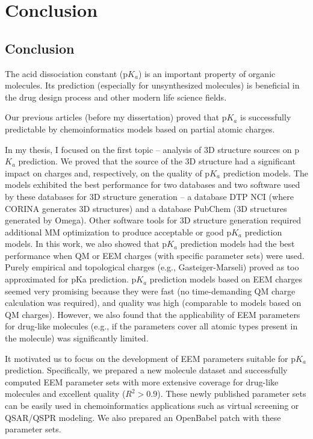 \part{Conclusion}

\chapter{Conclusion}

The acid dissociation constant (p$K_a$) is an important property of organic
mo\-le\-cules. Its prediction (especially for unsynthesized molecules) is beneficial
in the drug design process and other modern life science fields.

Our previous articles \cite{Svobodova2011, Svobodova2013} (before my
dissertation) proved that p$K_a$ is successfully predictable by
chemoinformatics models based on partial atomic charges.

In my thesis, I focused on the first topic -- analysis of 3D structure sources
on p$K_a$ prediction. We proved that the source of the 3D structure had
a significant impact on charges and, respectively, on the quality of p$K_a$
prediction models. The models exhibited the best performance for two databases
and two software used by these databases for 3D structure generation -- 
a database DTP NCI (where CORINA generates 3D structures) and a database
PubChem (3D structures generated by Omega). Other software tools for 3D
structure generation required additional MM optimization to produce acceptable
or good p$K_a$ prediction models. In this work, we also showed that p$K_a$
prediction models had the best performance when QM or EEM charges (with specific
parameter sets) were used. Purely empirical and topological charges (e.g.,
Gasteiger-Marseli) proved as too approximated for pKa prediction. p$K_a$
prediction models based on EEM charges seemed very promising because they were
fast (no time-demanding QM charge calculation was required), and quality was
high (comparable to models based on QM charges). However, we also found that
the applicability of EEM parameters for drug-like molecules (e.g., if the
parameters cover all atomic types present in the molecule) was significantly
limited. 

It motivated us to focus on the development of EEM parameters suitable 
for p$K_a$ prediction. Specifically, we prepared a new molecule dataset and
successfully computed EEM parameter sets with more extensive coverage
for drug-like molecules and excellent quality ($R^2 > 0.9$). These newly published
parameter sets can be easily used in chemoinformatics applications
such as virtual screening or QSAR/QSPR modeling. We also prepared an OpenBabel
patch with these parameter sets.

